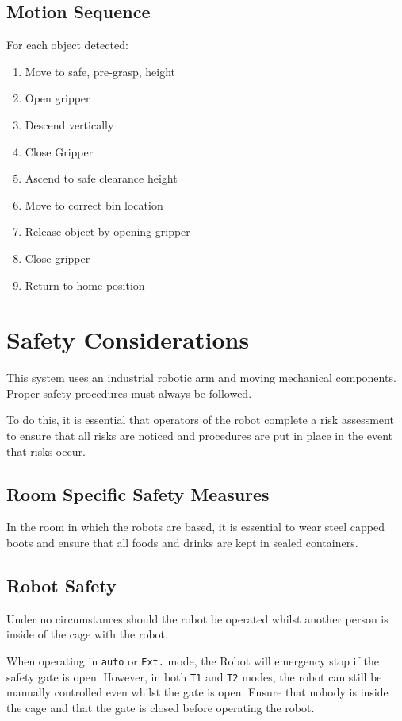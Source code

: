\documentclass{ol-softwaremanual}
\begin{document}
\subsection{Motion Sequence}

For each object detected:
\begin{enumerate}
    \item Move to safe, pre-grasp, height
    \item Open gripper
    \item Descend vertically
    \item Close Gripper
    \item Ascend to safe clearance height
    \item Move to correct bin location
    \item Release object by opening gripper
    \item Close gripper
    \item Return to home position
\end{enumerate}

\section{Safety Considerations}

This system uses an industrial robotic arm and moving mechanical components. Proper safety procedures must always be followed.

To do this, it is essential that operators of the robot complete a risk assessment to ensure that all risks are noticed and procedures are put in place in the event that risks occur.

\subsection{Room Specific Safety Measures}
In the room in which the robots are based, it is essential to wear steel capped boots and ensure that all foods and drinks are kept in sealed containers.

\subsection{Robot Safety}
Under no circumstances should the robot be operated whilst another person is inside of the cage with the robot.

When operating in \lstinline{auto} or \lstinline{Ext.} mode, the Robot will emergency stop if the safety gate is open. However, in both \lstinline{T1} and \lstinline{T2} modes, the robot can still be manually controlled even whilst the gate is open. Ensure that nobody is inside the cage and that the gate is closed before operating the robot.
\end{document}

